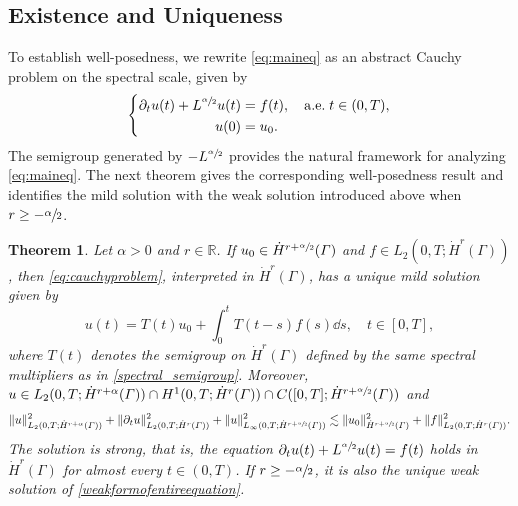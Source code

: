\documentclass[numbers,webpdf]{ima-authoring-template}%
\theoremstyle{thmstyletwo}%
\newtheorem{theorem}{Theorem}%
\numberwithin{equation}{section}
\newcommand{\almosteverywhere}{\mathrm{a.e.}\;}
\begin{document}
\subsection{Existence and Uniqueness}
\label{existencesection}
To establish well-posedness, we rewrite \eqref{eq:maineq} as an abstract Cauchy problem on the spectral scale, given by
\begin{equation}
\label{eq:cauchyproblem}
    \left\{
\begin{aligned}
    \partial_tu(t)+L^{\sfrac{\alpha}{2}}u(t)&=f(t),\quad \almosteverywhere t\in (0, T),\\  
    u(0)&=u_0.
\end{aligned}
\right.
\end{equation}
The semigroup generated by $-L^{\sfrac{\alpha}{2}}$ provides the natural framework for analyzing \eqref{eq:maineq}. The next theorem gives the corresponding well-posedness result and identifies the mild solution with the weak solution introduced above when $r\geq-\sfrac{\alpha}{2}$.
\begin{theorem}
\label{theorem:existenceuniquenessandregularity}
Let $\alpha>0$ and $r\in\mathbb{R}$. If $u_0\in\dot{H}^{r+\sfrac{\alpha}{2}}({\mit\varGamma})$ and $f\in L_2(0,T;\dot{H}^{r}(\Gamma))$, then \eqref{eq:cauchyproblem}, interpreted in $\dot{H}^{r}(\Gamma)$, has a unique mild solution given by
\begin{equation}
\label{eq:mildsolution}
    u(t)=T(t)u_0+\int_0^t T(t-s)f(s)\dd s,
    \quad t\in[0,T],
\end{equation}
where $T(t)$ denotes the semigroup on $\dot{H}^{r}(\Gamma)$ defined by the same spectral multipliers as in \eqref{spectral_semigroup}. Moreover, $u\in L_2(0,T;\dot{H}^{r+\alpha}({\mit\varGamma}))
    \cap H^1(0,T;\dot{H}^{r}({\mit\varGamma}))
    \cap C([0,T];\dot{H}^{r+\sfrac{\alpha}{2}}({\mit\varGamma}))$
and
\begin{align}
\label{ineq:boundonu}
    \|u\|_{L_2(0,T;\dot{H}^{r+\alpha}({\mit\varGamma}))}^2 +\|\partial_tu\|_{L_2(0,T;\dot{H}^{r}({\mit\varGamma}))}^2 +\|u\|_{L_\infty(0,T;\dot{H}^{r+\sfrac{\alpha}{2}}({\mit\varGamma}))}^2 \lesssim\|u_0\|_{\dot{H}^{r+\sfrac{\alpha}{2}}({\mit\varGamma})}^2 +\|f\|_{L_2(0,T;\dot{H}^{r}({\mit\varGamma}))}^2.
\end{align}
The solution is strong, that is, the equation $\partial_tu(t)+L^{\sfrac{\alpha}{2}}u(t)=f(t)$ holds in $\dot{H}^{r}(\Gamma)$ for almost every $t\in(0,T)$. If $r\geq-\sfrac{\alpha}{2}$, it is also the unique weak solution of \eqref{weakformofentireequation}.
\end{theorem}
\end{document}

